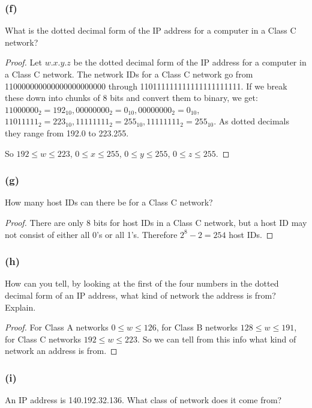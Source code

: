\documentclass[14pt]{extarticle}
\begin{document}
\subsubsection{(f)}
What is the dotted decimal form of the IP address for a computer in a Class C network?

\begin{proof}
     Let \(w.x.y.z\) be the dotted decimal form of the IP address for a computer in a Class C network. The network IDs for a
     Class C network go from 110000000000000000000000 through 110111111111111111111111. If we break these down into chunks
     of 8 bits and convert them to binary, we get: \(11000000_2 = 192_{10}, 00000000_2 = 0_{10}, 00000000_2 = 0_{10}\),
     \(11011111_2 = 223_{10}, 11111111_2 = 255_{10}, 11111111_2 = 255_{10}\). As dotted decimals they range from 192.0 to
     223.255.

     So \(192 \leq w \leq 223\), \(0 \leq x \leq 255\), \(0 \leq y \leq 255\), \(0 \leq z \leq 255\).
\end{proof}

\subsubsection{(g)}
How many host IDs can there be for a Class C network?

\begin{proof}
     There are only 8 bits for host IDs in a Class C network, but a host ID may not consist of either all 0’s or all 1’s.
     Therefore \(2^8 - 2 = 254\) host IDs.
\end{proof}

\subsubsection{(h)}
How can you tell, by looking at the first of the four numbers in the dotted decimal form of an IP address, what
kind of network the address is from? Explain.

\begin{proof}
     For Class A networks \(0 \leq w \leq 126\), for Class B networks \(128 \leq w \leq 191\), for Class C networks
     \(192 \leq w \leq 223\). So we can tell from this info what kind of network an address is from.
\end{proof}

\subsubsection{(i)}
An IP address is 140.192.32.136. What class of network does it come from?
\end{document}
